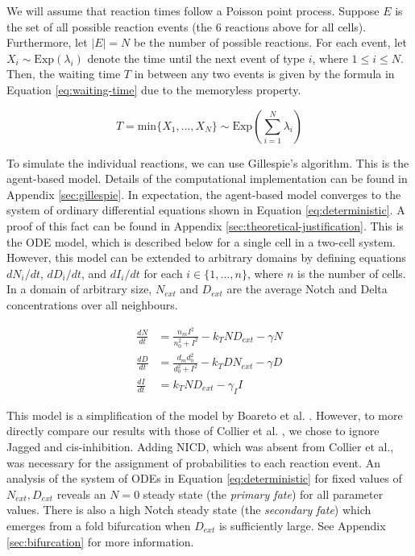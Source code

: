 \documentclass{article}
\begin{document}
We will assume that reaction times follow a Poisson point process.
Suppose $E$ is the set of all possible reaction events (the $6$ reactions above for all cells).
Furthermore, let $|E| = N$ be the number of possible reactions.
For each event, let $X_{i} \sim \text{Exp}(\lambda_{i})$ denote the time until the next event of type $i$, where $1 \leq i \leq N$.
Then, the waiting time $T$ in between any two events is given by the formula in Equation \ref{eq:waiting-time} due to the memoryless property.

\begin{equation}
T = \text{min} \{ X_{1}, \dots, X_{N} \} \sim \text{Exp}\left( \sum_{i = 1}^{N} \lambda_{i} \right) 
\label{eq:waiting-time}
\end{equation}

To simulate the individual reactions, we can use Gillespie's algorithm.
This is the agent-based model.
Details of the computational implementation can be found in Appendix \ref{sec:gillespie}.
In expectation, the agent-based model converges to the system of ordinary differential equations shown in Equation \ref{eq:deterministic}.
A proof of this fact can be found in Appendix \ref{sec:theoretical-justification}.
This is the ODE model, which is described below for a single cell in a two-cell system.
However, this model can be extended to arbitrary domains by defining equations $dN_{i}/dt$, $dD_{i}/dt$, and $dI_{i}/dt$ for each $i \in \{ 1, \dots, n \}$, where $n$ is the number of cells.
In a domain of arbitrary size, $N_{ext}$ and $D_{ext}$ are the average Notch and Delta concentrations over all neighbours.

\begin{equation}
\begin{aligned}
  \frac{dN}{dt} &= \frac{n_{m}I^2}{n_{0}^2 + I^2} - k_{T}ND_{ext} - \gamma N \\[5pt]
  \frac{dD}{dt} &= \frac{d_{m}d_{0}^2}{d_{0}^2 + I^2} - k_{T}DN_{ext} - \gamma D \\[5pt]
  \frac{dI}{dt} &= k_{T}ND_{ext} - \gamma_{I}I
\end{aligned}
\label{eq:deterministic}
\end{equation}

This model is a simplification of the model by Boareto et al. \cite{boareto_jaggeddelta_2015}.
However, to more directly compare our results with those of Collier et al. \cite{collier_pattern_1996}, we chose to ignore Jagged and cis-inhibition.
Adding NICD, which was absent from Collier et al., was necessary for the assignment of probabilities to each reaction event.
An analysis of the system of ODEs in Equation \ref{eq:deterministic} for fixed values of $N_{ext}, D_{ext}$ reveals an $N = 0$ steady state (the \emph{primary fate}) for all parameter values.
There is also a high Notch steady state (the \emph{secondary fate}) which emerges from a fold bifurcation when $D_{ext}$ is sufficiently large.
See Appendix \ref{sec:bifurcation} for more information.
\end{document}

